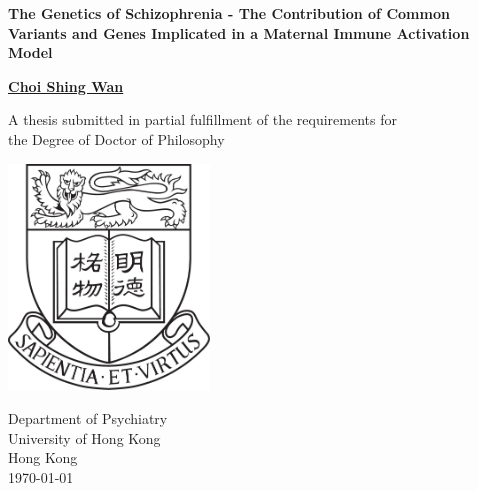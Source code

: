 \documentclass[12pt]{scrbook}
\begin{document}
\thispagestyle{empty}
\pagestyle{empty}

\begin{singlespace}
	\begin{titlepage}
		\begin{center}
			\vspace*{1cm}
			
			\Huge
			\textbf{The Genetics of Schizophrenia - The Contribution of Common Variants and Genes Implicated in a Maternal Immune Activation Model}
			
			\vspace{0.5cm}
			\LARGE
			
			\vspace{1.5cm}
			
			\textbf{\href{mailto:choishingwan@gmail.com}{Choi Shing Wan}}
			
			\vfill
			
			A thesis submitted in partial fulfillment of the requirements for \\
			the Degree of Doctor of Philosophy
			
			\vspace{0.8cm}
			
			\includegraphics[width=0.4\textwidth]{figure/hkuLogo.jpg}
			
			\Large
			Department of Psychiatry\\
			University of Hong Kong\\
			Hong Kong\\
			\today
		\end{center}
	\end{titlepage}
\end{singlespace}


\frontmatter 
	\cleardoublepage
\end{document}
